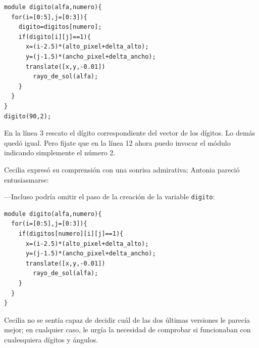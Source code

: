 \begin{lstlisting}
module digito(alfa,numero){
  for(i=[0:5],j=[0:3]){
    digito=digitos[numero];
    if(digito[i][j]==1){
      x=(i-2.5)*(alto_pixel+delta_alto);
      y=(j-1.5)*(ancho_pixel+delta_ancho);
      translate([x,y,-0.01])
        rayo_de_sol(alfa);
    }
  }
}
digito(90,2);
\end{lstlisting}

     
\guillemotright En la línea 3 rescato el dígito correspondiente del
vector de los dígitos. Lo demás quedó igual. Pero fijate que en la
línea 12 ahora puedo invocar el módulo indicando simplemente el número
2.
     
Cecilia expresó su comprensión con una sonrisa admirativa; Antonia
pareció entusiasmarse:

---Incluso podría omitir el paso de la creación de la variable
\lstinline!digito!:

\begin{lstlisting}
module digito(alfa,numero){
  for(i=[0:5],j=[0:3]){
    if(digitos[numero][i][j]==1){
      x=(i-2.5)*(alto_pixel+delta_alto);
      y=(j-1.5)*(ancho_pixel+delta_ancho);
      translate([x,y,-0.01])
        rayo_de_sol(alfa);
    }
  }
}
\end{lstlisting}



Cecilia no se sentía capaz de decidir cuál de las dos últimas
versiones le parecía mejor; en cualquier caso, le urgía la necesidad
de comprobar si funcionaban con cualesquiera dígitos y ángulos.


